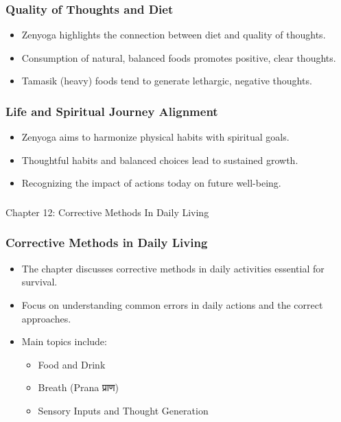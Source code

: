 \begin{frame}[fragile]\frametitle{Quality of Thoughts and Diet}
    \begin{itemize}
        \item Zenyoga highlights the connection between diet and quality of thoughts.
        \item Consumption of natural, balanced foods promotes positive, clear thoughts.
        \item Tamasik (heavy) foods tend to generate lethargic, negative thoughts.
    \end{itemize}
\end{frame}

\begin{frame}[fragile]\frametitle{Life and Spiritual Journey Alignment}
    \begin{itemize}
        \item Zenyoga aims to harmonize physical habits with spiritual goals.
        \item Thoughtful habits and balanced choices lead to sustained growth.
        \item Recognizing the impact of actions today on future well-being.
    \end{itemize}
\end{frame}


\begin{frame}[fragile]\frametitle{}
\begin{center}
{\Large Chapter 12: Corrective Methods In Daily Living }
\end{center}
\end{frame}

\begin{frame}[fragile]\frametitle{Corrective Methods in Daily Living}
    \begin{itemize}
        \item The chapter discusses corrective methods in daily activities essential for survival.
        \item Focus on understanding common errors in daily actions and the correct approaches.
        \item Main topics include:
        \begin{itemize}
            \item Food and Drink
            \item Breath (Prana प्राण)
            \item Sensory Inputs and Thought Generation
        \end{itemize}
    \end{itemize}
\end{frame}


